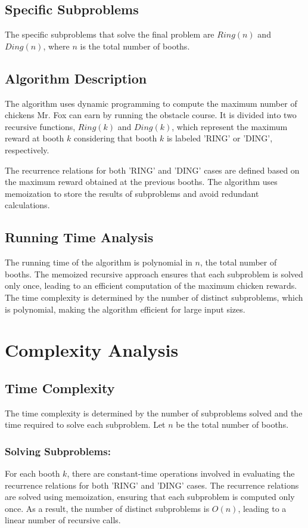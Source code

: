 \documentclass{article}
\begin{document}
\subsection{Specific Subproblems}

The specific subproblems that solve the final problem are \(Ring(n)\) and \(Ding(n)\), where \(n\) is the total number of booths.

\subsection{Algorithm Description}

The algorithm uses dynamic programming to compute the maximum number of chickens Mr. Fox can earn by running the obstacle course. It is divided into two recursive functions, \(Ring(k)\) and \(Ding(k)\), which represent the maximum reward at booth \(k\) considering that booth \(k\) is labeled 'RING' or 'DING', respectively.

The recurrence relations for both 'RING' and 'DING' cases are defined based on the maximum reward obtained at the previous booths. The algorithm uses memoization to store the results of subproblems and avoid redundant calculations.

\subsection{Running Time Analysis}

The running time of the algorithm is polynomial in \(n\), the total number of booths. The memoized recursive approach ensures that each subproblem is solved only once, leading to an efficient computation of the maximum chicken rewards. The time complexity is determined by the number of distinct subproblems, which is polynomial, making the algorithm efficient for large input sizes.
\section{Complexity Analysis}

\subsection{Time Complexity}

The time complexity is determined by the number of subproblems solved and the time required to solve each subproblem. Let \(n\) be the total number of booths.

\subsubsection{Solving Subproblems:}
For each booth \(k\), there are constant-time operations involved in evaluating the recurrence relations for both 'RING' and 'DING' cases. The recurrence relations are solved using memoization, ensuring that each subproblem is computed only once. As a result, the number of distinct subproblems is \(O(n)\), leading to a linear number of recursive calls.
\end{document}
